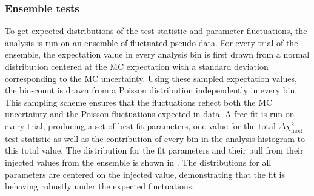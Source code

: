 \subsubsection{Ensemble tests}
\label{sec:three-flavor-ensemble}
To get expected distributions of the test statistic and parameter fluctuations, the analysis is run on an ensemble of fluctuated pseudo-data. For every trial of the ensemble, the expectation value in every analysis bin is first drawn from a normal distribution centered at the MC expectation with a standard deviation corresponding to the MC uncertainty. Using these sampled expectation values, the bin-count is drawn from a Poisson distribution independently in every bin. This sampling scheme ensures that the fluctuations reflect both the MC uncertainty and the Poisson fluctuations expected in data. A free fit is run on every trial, producing a set of best fit parameters, one value for the total $\Delta \chi^2_{\mathrm{mod}}$ test statistic as well as the contribution of every bin in the analysis histogram to this total value. The distribution for the fit parameters and their pull from their injected values from the ensemble is shown in . The distributions for all parameters are centered on the injected value, demonstrating that the fit is behaving robustly under the expected fluctuations. 

